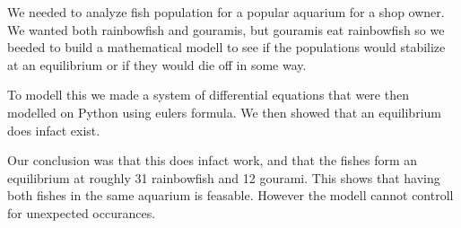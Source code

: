 \begin{flushleft}
    We needed to analyze fish population for a popular aquarium for a shop owner.
    We wanted both rainbowfish and gouramis, but gouramis eat rainbowfish so we
    beeded to build a mathematical modell to see if the populations would stabilize
    at an equilibrium or if they would die off in some way.

\end{flushleft}

\begin{flushleft}
    To modell this we made a system of differential equations that
    were then modelled on Python using eulers formula. We then showed
    that an equilibrium does infact exist.
\end{flushleft}

\begin{flushleft}
    Our conclusion was that this does infact work, and that the fishes
    form an equilibrium at roughly 31 rainbowfish and 12 gourami. This shows
    that having both fishes in the same aquarium is feasable. However the modell
    cannot controll for unexpected occurances.
\end{flushleft}